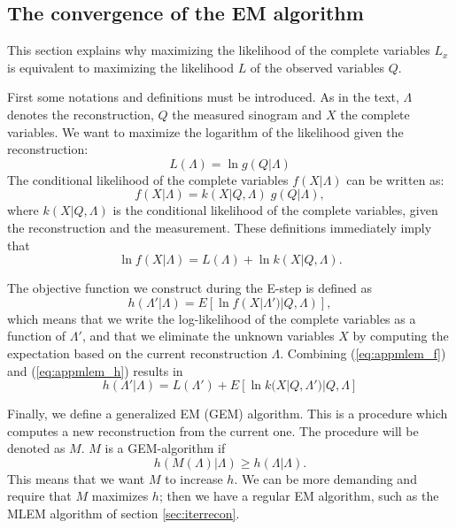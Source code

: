 \documentclass[11pt,oneside]{article}
\begin{document}
\newpage
\subsection{The convergence of the EM algorithm} \label{app:em}
This section explains why maximizing the likelihood of the complete variables
$L_x$ is equivalent to maximizing the likelihood $L$ of the observed variables
$Q$.

First some notations and definitions must be introduced. As in the text,
$\Lambda$ denotes the reconstruction, $Q$ the measured sinogram and $X$ the
complete variables. We want to maximize the logarithm of the likelihood
given the reconstruction:
\begin{equation}
  L(\Lambda) = \ln g(Q | \Lambda)
\end{equation}
The conditional likelihood of the complete variables $f(X | \Lambda)$  can be
written as:
\begin{equation}
  f(X | \Lambda) = k(X | Q, \Lambda) \; g(Q | \Lambda),
\end{equation}
where $k(X | Q, \Lambda)$ is the conditional likelihood of the complete
variables, given the reconstruction and the measurement. These definitions
immediately  imply that
\begin{equation}
  \ln f(X | \Lambda) = L(\Lambda) + \ln k(X | Q, \Lambda). \label{eq:appmlem_f}
\end{equation}

The objective function we construct during the E-step is defined as
\begin{equation}
  h(\Lambda' | \Lambda) = E\left[\ln f(X | \Lambda') | Q, \Lambda)\right],
      \label{eq:appmlem_h}
\end{equation}
which means that we write the log-likelihood of the complete variables as a
function of $\Lambda'$, and that we eliminate the unknown variables $X$ by
computing the expectation based on the current reconstruction $\Lambda$.
Combining (\ref{eq:appmlem_f}) and (\ref{eq:appmlem_h}) results in
\begin{equation}
  h(\Lambda' | \Lambda) = L(\Lambda') + E\left[\ln k(X | Q, \Lambda') | Q,\Lambda\right]
   \label{eq:appmlem_h2}
\end{equation}

Finally, we define a generalized EM (GEM) algorithm. This is a procedure which
computes a new reconstruction from the current one. The procedure will be
denoted as $M$. $M$ is a GEM-algorithm if
\begin{equation}
  h(M(\Lambda) | \Lambda) \geq h(\Lambda | \Lambda).
\end{equation}
This means that we want $M$ to increase $h$. We can be more demanding and
require that $M$ maximizes $h$; then we have a regular EM algorithm, such as
the MLEM algorithm of section \ref{sec:iterrecon}.
\end{document}
